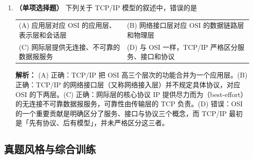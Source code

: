 \begin{enumerate}
\ifshowsolutions\par\noindent\textbf{解析：} 封装是逐层加控制信息，每层都要把上层交下来的整个 PDU 当作数据，再在前面加首部（链路层还要在末尾加尾部）。总开销 $=20+20+18+4=62$ B。
（1）帧长 $=1000+62=1062$ B，效率 $=1000/1062\approx0.9416\approx94.2\%$。
（2）帧长 $=9000+62=9062$ B，效率 $=9000/9062\approx0.9932\approx99.3\%$。
可见开销字节数固定时，数据越长，开销占比越小、效率越高；这也解释了为什么大文件传输时首部开销可以忽略，而小分组（如语音）必须重视首部占比。比值是无量纲的，用 B 或 bit 计算都一样。\else \answerarea[4] \fi

\vspace{8pt}

\item \textbf{（单项选择题）} 下列关于 TCP/IP 模型的叙述中，错误的是
\begin{center}
\begin{tabularx}{\linewidth}{@{}XX@{}}
(A) 应用层对应 OSI 的应用层、表示层和会话层 & (B) 网络接口层对应 OSI 的数据链路层和物理层 \\[4pt]
(C) 网际层提供无连接、不可靠的数据报服务 & (D) 与 OSI 一样，TCP/IP 严格区分服务、接口和协议
\end{tabularx}
\end{center}

\ifshowsolutions\par\noindent\textbf{解析：} (A) 正确：TCP/IP 把 OSI 高三个层次的功能合并为一个应用层。(B) 正确：TCP/IP 的网络接口层（又称网络接入层）并不规定具体协议，对应 OSI 的下两层。(C) 正确：网际层的核心协议 IP 提供尽力而为（best-effort）的无连接不可靠数据报服务，可靠性由传输层的 TCP 负责。(D) 错误：OSI 的一个重要贡献是明确区分了服务、接口与协议三个概念，而 TCP/IP 最初是「先有协议、后有模型」，并未严格区分这三者。\else \answerarea \fi

\end{enumerate}

\subsection{真题风格与综合训练}

